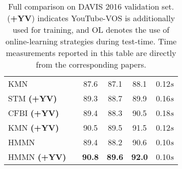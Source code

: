 \begin{table}[t]
\begin{center}
\begin{tabular}{lccccc}
KMN \cite{seong2020kernelized}                          &            & 87.6                  & 87.1                  & 88.1                  & 0.12$s$  \\
STM \textbf{(+YV)}   \cite{Oh_2019_ICCV}                &            & 89.3                  & 88.7                  & 89.9                  & 0.16$s$  \\
CFBI \textbf{(+YV)}   \cite{yang2020collaborative}      &            & 89.4                  & 88.3                  & 90.5                  & 0.18$s$  \\
KMN \textbf{(+YV)}   \cite{seong2020kernelized}         &            & 90.5                  & 89.5                  & 91.5                  & 0.12$s$  \\
\midrule
HMMN                                                    &            & 89.4 & 88.2 & 90.6  & 0.10$s$  \\
HMMN \textbf{(+YV)}                                     &            & \textbf{90.8}         & \textbf{89.6}         & \textbf{92.0}         & 0.10$s$ \\
\bottomrule
\end{tabular}
\end{center}
\caption{Full comparison on DAVIS 2016 validation set.
(\textbf{+YV}) indicates YouTube-VOS is additionally used for training, and OL denotes the use of online-learning strategies during test-time. Time measurements reported in this table are directly from the corresponding papers. 
}
\label{tab:davis2016_val_supp}
\end{table}

